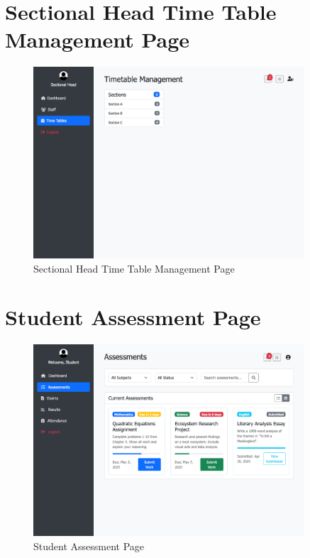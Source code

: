 \documentclass[12pt,a4paper]{report}
\begin{document}
\section{Sectional Head Time Table Management Page}
\begin{figure}[htbp]
    \centering
    \includegraphics[width=0.9\textwidth]{sectionalhead-time-table-management-page.png}
    \caption{Sectional Head Time Table Management Page}
    \label{fig:sectionalhead-time-table-management-page}
\end{figure}

\section{Student Assessment Page}
\begin{figure}[htbp]
    \centering
    \includegraphics[width=0.9\textwidth]{student-assessment-page.png}
    \caption{Student Assessment Page}
    \label{fig:student-assessment-page}
\end{figure}
\end{document}
